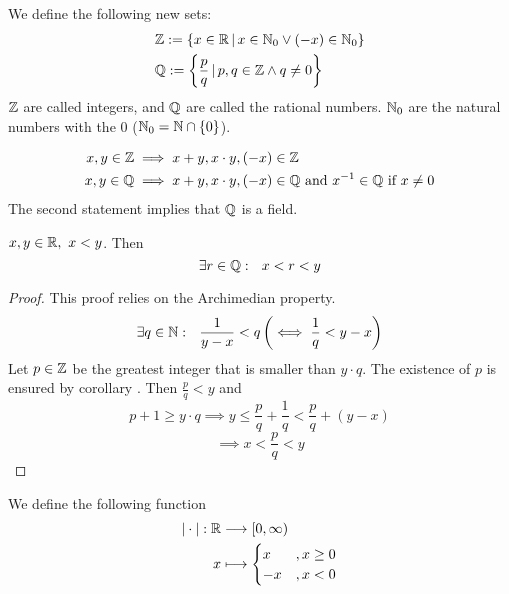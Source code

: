 \documentclass[../../script.tex]{subfiles}
\begin{document}
\begin{defi}
We define the following new sets:
\begin{align*}
	&\mathbb{Z} := \{x \in \mathbb{R} \,\vert\, x \in \mathbb{N}_0 \vee (-x) \in \mathbb{N}_0\}\\
	&\mathbb{Q} := \left\{\frac{p}{q} \,\vert\, p, q \in \mathbb{Z} \wedge q \ne 0\right\}
\end{align*}
$\mathbb{Z}$ are called integers, and $\mathbb{Q}$ are called the rational numbers. $\mathbb{N}_0$ are the natural numbers with the $0$ ($\mathbb{N}_0 = \mathbb{N} \cap \{0\}$).
\end{defi}

\begin{rem}
\begin{align*}
	x, y \in \mathbb{Z} &\implies x+y, x\cdot y, (-x) \in \mathbb{Z} \\
	x, y \in \mathbb{Q} &\implies x+y, x\cdot y, (-x) \in \mathbb{Q} \text{ and } {x}^{-1} \in \mathbb{Q} \text{ if } x \ne 0
\end{align*}
The second statement implies that $\mathbb{Q}$ is a field.
\end{rem}

\begin{cor}\label{cor:densityrats}
$x, y \in \mathbb{R}, ~x < y$. Then
\[
	\exists r \in \mathbb{Q}: ~~x < r < y
\]
\end{cor}
\begin{proof}
This proof relies on the Archimedian property.
\begin{equation}
	\exists q \in \mathbb{N}: ~~ \frac{1}{y-x} < q \left( \iff \frac{1}{q} < y - x \right)
\end{equation}
Let $p \in \mathbb{Z}$ be the greatest integer that is smaller than $y \cdot q$. The existence of $p$ is ensured by corollary . Then $\frac{p}{q} < y$ and
\begin{equation}
	p + 1 \ge y \cdot q \implies y \le \frac{p}{q} + \frac{1}{q} < \frac{p}{q} + (y - x)
\end{equation}
\begin{equation}
	\implies x < \frac{p}{q} < y
\end{equation}
\end{proof}

\begin{defi}
We define the following function
\begin{align*}
	|\cdot|: \mathbb{R} &\longrightarrow [0, \infty) \\
	x &\longmapsto 
	\begin{cases}
		x &, x \ge 0 \\
		-x &, x < 0
	\end{cases}
\end{align*}
\end{defi}
\end{document}
